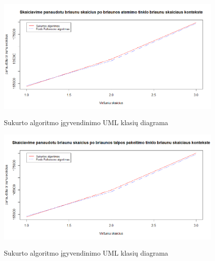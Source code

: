 \begin{figure}[H]
	\caption{Sukurto algoritmo įgyvendinimo UML klasių diagrama}
	\centering
	\includegraphics[width=\textwidth]{img/ere.png}
	\label{plot:ere}
\end{figure}
\begin{figure}[H]
	\caption{Sukurto algoritmo įgyvendinimo UML klasių diagrama}
	\centering
	\includegraphics[width=\textwidth]{img/eue.png}
	\label{plot:eue}
\end{figure}

